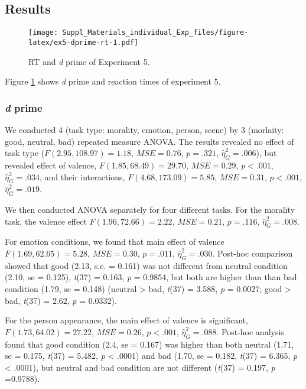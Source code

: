 \documentclass[man]{apa6}
\begin{document}
\hypertarget{results-8}{%
\subsection{Results}\label{results-8}}

\begin{figure}
\centering
\texttt{[image: Suppl\_Materials\_individual\_Exp\_files/figure-latex/ex5-dprime-rt-1.pdf]}
\caption{\label{fig:ex5-dprime-rt}RT and \emph{d} prime of Experiment 5.}
\end{figure}

Figure \ref{fig:ex5-dprime-rt} shows \emph{d} prime and reaction times of experiment 5.

\hypertarget{d-prime-5}{%
\subsubsection{\texorpdfstring{\emph{d} prime}{d prime}}\label{d-prime-5}}

We conducted 4 (task type: morality, emotion, person, scene) by 3 (morlaity: good, neutral, bad) repeated measure ANOVA. The results revealed no effect of task type (\(F(2.95, 108.97) = 1.18\), \(\mathit{MSE} = 0.76\), \(p = .321\), \(\hat{\eta}^2_G = .006\)), but revealed effect of valence, \(F(1.85, 68.49) = 29.70\), \(\mathit{MSE} = 0.29\), \(p < .001\), \(\hat{\eta}^2_G = .034\), and their interactions, \(F(4.68, 173.09) = 5.85\), \(\mathit{MSE} = 0.31\), \(p < .001\), \(\hat{\eta}^2_G = .019\).

We then conducted ANOVA separately for four different tasks. For the morality task, the valence effect \(F(1.96, 72.66) = 2.22\), \(\mathit{MSE} = 0.21\), \(p = .116\), \(\hat{\eta}^2_G = .008\).

For emotion conditions, we found that main effect of valence \(F(1.69, 62.65) = 5.28\), \(\mathit{MSE} = 0.30\), \(p = .011\), \(\hat{\eta}^2_G = .030\). Post-hoc comparison showed that good (2.13, s.e. = 0.161) was not different from neutral condition (2.10, se = 0.125), \emph{t}(37) = 0.163, \emph{p} = 0.9854, but both are higher than than bad condition (1.79, se = 0.148) (neutral \textgreater{} bad, \emph{t}(37) = 3.588, \emph{p} = 0.0027; good \textgreater{} bad, \emph{t}(37) = 2.62, \emph{p} = 0.0332).

For the person appearance, the main effect of valence is significant, \(F(1.73, 64.02) = 27.22\), \(\mathit{MSE} = 0.26\), \(p < .001\), \(\hat{\eta}^2_G = .088\). Post-hoc analysis found that good condition (2.4, se = 0.167) was higher than both neutral (1.71, se = 0.175, \emph{t}(37) = 5.482, \emph{p} \textless{} .0001) and bad (1.70, se = 0.182, \emph{t}(37) = 6.365, \emph{p} \textless{} .0001), but neutral and bad condition are not different (\emph{t}(37) = 0.197, \emph{p} =0.9788).
\end{document}
